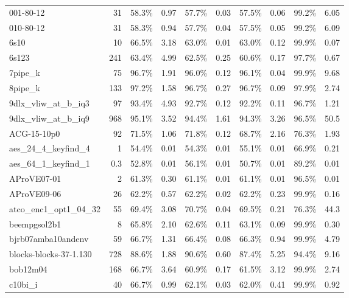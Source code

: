 \documentclass{llncs}
\begin{document}
\begin{table}
\begin{center}
\begin{tabular}{|l|r|c|c|c|c|c|c|c|c|}
001-80-12                &  31  &  58.3\% & 0.97 &  57.7\% & 0.03 & 57.5\% & 0.06 & 99.2\% &  6.05 \\
010-80-12                &  31  &  58.3\% & 0.94 &  57.7\% & 0.04 & 57.5\% & 0.05 & 99.2\% &  6.09 \\
6s10                     &  10  &  66.5\% & 3.18 &  63.0\% & 0.01 & 63.0\% & 0.12 & 99.9\% &  0.07 \\
6s123                    &  241 &  63.4\% & 4.99 &  62.5\% & 0.25 & 60.6\% & 0.17 & 97.7\% &  0.67 \\
7pipe\_k                 &  75  &  96.7\% & 1.91 &  96.0\% & 0.12 & 96.1\% & 0.04 & 99.9\% &  9.68 \\
8pipe\_k                 &  133 &  97.2\% & 1.58 &  96.7\% & 0.27 & 96.7\% & 0.09 & 97.9\% &  2.74 \\
9dlx\_vliw\_at\_b\_iq3   &  97  &  93.4\% & 4.93 &  92.7\% & 0.12 & 92.2\% & 0.11 & 96.7\% &  1.21 \\
9dlx\_vliw\_at\_b\_iq9   & 968  &  95.1\% & 3.52 &  94.4\% & 1.61 & 94.3\% & 3.26 & 96.5\% &  50.5 \\
ACG-15-10p0              &  92  &  71.5\% & 1.06 &  71.8\% & 0.12 & 68.7\% & 2.16 & 76.3\% &  1.93 \\
aes\_24\_4\_keyfind\_4   &  1   &  54.4\% & 0.01 &  54.3\% & 0.01 & 55.1\% & 0.01 & 66.9\% &  0.21 \\
aes\_64\_1\_keyfind\_1   & 0.3  &  52.8\% & 0.01 &  56.1\% & 0.01 & 50.7\% & 0.01 & 89.2\% &  0.01 \\
AProVE07-01              & 2    &  61.3\% & 0.30 &  61.1\% & 0.01 & 61.1\% & 0.01 & 96.5\% &  0.01 \\
AProVE09-06              & 26   &  62.2\% & 0.57 &  62.2\% & 0.02 & 62.2\% & 0.23 & 99.9\% &  0.16 \\
atco\_enc1\_opt1\_04\_32 & 55   &  69.4\% & 3.08 &  70.7\% & 0.04 & 69.5\% & 0.21 & 76.3\% &  44.3 \\
beempgsol2b1             & 8    &  65.8\% & 2.10 &  62.6\% & 0.11 & 63.1\% & 0.09 & 99.9\% &  0.30 \\
bjrb07amba10andenv       & 59   &  66.7\% & 1.31 &  66.4\% & 0.08 & 66.3\% & 0.94 & 99.9\% &  4.79 \\
blocks-blocks-37-1.130   & 728  &  88.6\% & 1.88 &  90.6\% & 0.60 & 87.4\% & 5.25 & 94.4\% &  9.16 \\
bob12m04                 & 168  &  66.7\% & 3.64 &  60.9\% & 0.17 & 61.5\% & 3.12 & 99.9\% &  2.74 \\
c10bi\_i                 &  40  &  66.7\% & 0.99 &  62.1\% & 0.03 & 62.0\% & 0.41 & 99.9\% &  0.92 \\

\end{tabular}
\end{center}
\end{table}
\end{document}

